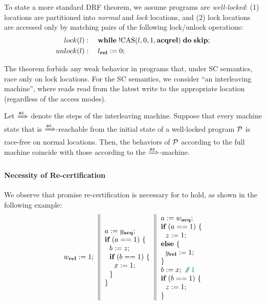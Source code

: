 To state a more standard DRF theorem, 
we assume programs are \emph{well-locked}:
(1) locations are partitioned into \emph{normal} and \emph{lock} locations, and
(2) lock locations are accessed only by matching pairs of the following lock/unlock operations:
\begin{align*}
lock(l) & : \quad \textbf{while}\;!\textrm{CAS}({l},{0},{1},{\textbf{acq}\textbf{rel}})\;\textbf{do}\;\textbf{skip}; \\
unlock(l) & : \quad l_{\textbf{rel}} := 0; 
\end{align*}

The theorem forbids any weak behavior in programs that, under SC semantics, race only on lock locations.
For the SC semantics, we consider ``an interleaving machine'', 
where reads read from the latest write to the appropriate location
(regardless of the access modes).

\begin{theorem}
\label{thm:drflock}
Let $\xRightarrow{{\texttt{sc}}}$ denote the steps of the interleaving machine.
Suppose that every machine state that is $\xRightarrow{{\texttt{sc}}}$-reachable from
the initial state of a well-locked program $\mathcal{P}$ is race-free on normal locations.
Then, the behaviors of $\mathcal{P}$ according to the full machine coincide with those
according to the $\xRightarrow{{\texttt{sc}}}$-machine.
\end{theorem}



\paragraph{Necessity of Re-certification}

We observe that promise re-certification is necessary for  to hold, as
shown in the following example:
\[
\inarrIII{ w_{\relw}:=1; }
         { a:=y_{\acqr}; \\
           \kw{if}~(a == 1)~\{ \\
           ~~b:=z; \\
           ~~\kw{if}~(b == 1)~\{ \\
           ~~~~x:=1; \\
           ~~\} \\
           \}
         }
         { a:=w_{\acqr}; \\
           \kw{if}~(a == 1)~\{ \\
           ~~z:=1; \\
           \kw{else}~\{ \\
           ~~y_{\relw}:=1; \\
           \} \\
           b:=x; \comment{1} \\
           \kw{if}~(b == 1)~\{ \\
           ~~z:=1; \\
           \}
         }
\]

